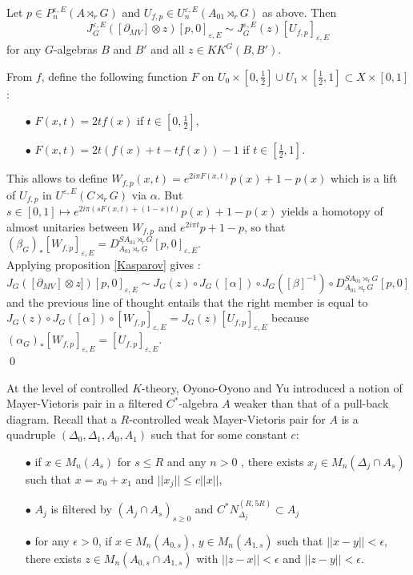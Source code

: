 \begin{lem}
Let $p\in P_n^{\varepsilon,E}(A\rtimes_r G)$ and $U_{f,p}\in U_n^{\varepsilon,E}(A_{01}\rtimes_r G)$ as above. Then
\[J^{\varepsilon, E}_G([\partial_{MV}]\otimes z ) [p,0]_{\varepsilon, E} \sim J^{\varepsilon, E}_G(z)[U_{f,p}]_{\varepsilon, E}\]
for any $G$-algebras $B$ and $B'$ and all $z\in KK^G(B,B')$.
\end{lem}

\begin{dem}
From $f$, define the following function $F$ on $U_0\times[0,\frac{1}{2}]\cup U_1\times [\frac{1}{2},1]\subset X\times[0,1]$: 
\begin{itemize}
\item[$\bullet$] $F(x,t)= 2t f(x)$ if $t\in [0,\frac{1}{2}]$,
\item[$\bullet$] $F(x,t)= 2t (f(x)+t-tf(x))-1$ if $t\in [\frac{1}{2},1]$.
\end{itemize} 
This allows to define $W_{f,p}(x,t)=e^{2i\pi F(x,t)}p(x)+1-p(x)$ which is a lift of $U_{f,p}$ in $U^{\varepsilon,E}( C \rtimes_r G)$ via $\alpha$.
But $s\in [0,1]\mapsto e^{2i\pi (sF(x,t)+(1-s)t)}p(x)+1-p(x)$ yields a homotopy of almost unitaries between $W_{f,p}$ and $e^{2i\pi t}p + 1-p$, so that $(\beta_G)_*[W_{f,p}]_{\varepsilon,E}=D_{A_{01}\rtimes_r G}^{SA_{01}\rtimes_r G} [p,0]_{\varepsilon,E}$.\\

Applying proposition \ref{Kasparov} gives : 
\[J_G([\partial_{MV}]\otimes z])[p,0]_{\varepsilon,E} \sim J_G(z)\circ J_G([\alpha])\circ J_G([\beta]^{-1}) \circ D_{A_{01}\rtimes_r G}^{SA_{01}\rtimes_r G} [p,0]  \]
and the previous line of thought entails that the right member is equal to $J_G(z)\circ J_G([\alpha]) \circ [W_{f,p}]_{\varepsilon,E} = J_G(z)[U_{f,p}]_{\varepsilon,E} $ because $(\alpha_G)_* [W_{f,p}]_{\varepsilon,E}=[U_{f,p}]_{\varepsilon,E} $.\\
\qed
\end{dem}

At the level of controlled $K$-theory, Oyono-Oyono and Yu introduced a notion of Mayer-Vietoris pair in a filtered $C^*$-algebra $A$ weaker than that of a pull-back diagram. Recall that a $R$-controlled weak Mayer-Vietoris pair for $A$ is a quadruple $(\Delta_0,\Delta_1,A_0,A_1)$ such that for some constant $c$:\\

\begin{itemize}
\item[$\bullet$] if $x\in M_n(A_s)$ for $s\leq R$ and any $n>0$ , there exists $x_j\in M_n(\Delta_j\cap A_s)$ such that $x=x_0+x_1$ and $||x_j||\leq c||x||$,
\item[$\bullet$] $A_j$ is filtered by $(A_j\cap A_s)_{s\geq 0}$ and $C^* N_{\Delta_j}^{(R,5R)}\subset A_j$
\item[$\bullet$] for any $\epsilon >0$, if $x\in M_n(A_{0,s})$, $y\in M_n(A_{1,s})$ such that $||x-y||<\epsilon$,  there exists $z\in M_n(A_{0,s}\cap A_{1,s})$ with $||z-x||<\epsilon$ and $||z-y||<\epsilon$. \\
\end{itemize}


